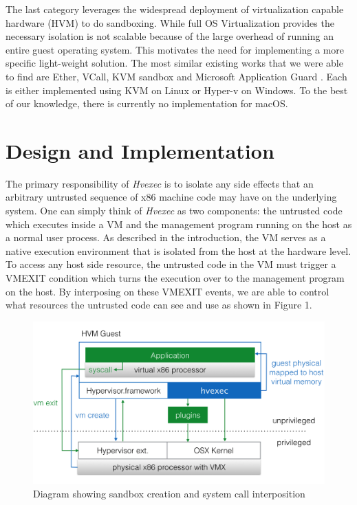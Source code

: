 \documentclass{article}
\newcommand{\PROJNAME}{\textit{Hvexec}}
\begin{document}
The last category leverages the widespread deployment of virtualization capable hardware (HVM) to do sandboxing.
While full OS Virtualization provides the necessary isolation is not scalable because of the large overhead of running an entire guest operating system.
This motivates the need for implementing a more specific light-weight solution.
The most similar existing works that we were able to find are Ether, VCall, KVM sandbox and Microsoft Application Guard \cite{Ether2008, Ayer2012, VCall2010, msft2016}.
Each is either implemented using KVM on Linux or Hyper-v on Windows.
To the best of our knowledge, there is currently no implementation for macOS.

\section{Design and Implementation}
The primary responsibility of \PROJNAME{} is to isolate any side effects that an arbitrary untrusted sequence of x86 machine code may have on the underlying system.
One can simply think of \PROJNAME{} as two components: the untrusted code which executes inside a VM and the management program running on the host as a normal user process.
As described in the introduction, the VM serves as a native execution environment that is isolated from the host at the hardware level.
To access any host side resource, the untrusted code in the VM must trigger a VMEXIT condition which turns the execution over to the management program on the host.
By interposing on these VMEXIT events, we are able to control what resources the untrusted code can see and use as shown in Figure 1.

\begin{figure}[ht]
    \includegraphics[width=16cm]{hvm}
    \caption{Diagram showing sandbox creation and system call interposition}
    \centering
\end{figure}
\end{document}
